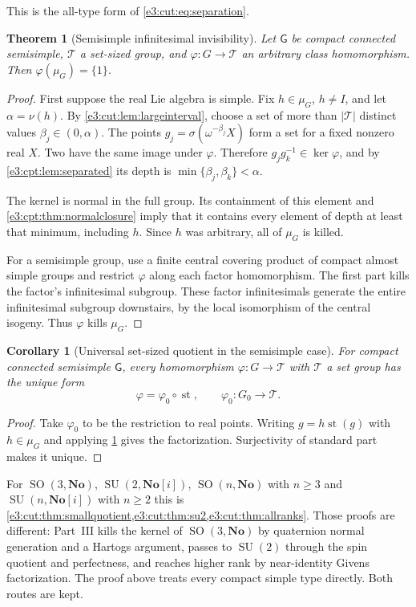\documentclass[11pt,letterpaper]{article}
\numberwithin{equation}{section}
\newtheorem{theorem}{Theorem}[section]
\newtheorem{corollary}[corollary]{Corollary}
\theoremstyle{definition}
\theoremstyle{remark}
\newcommand{\No}{\mathbf{No}}
\newcommand{\st}{\operatorname{st}}
\newcommand{\SO}{\operatorname{SO}}
\newcommand{\SU}{\operatorname{SU}}
\newcommand{\sG}{\mathsf G}
\begin{document}
This is the all-type form of \cref{e3:cut:eq:separation}.

\begin{theorem}[Semisimple infinitesimal invisibility]\label{e3:cpt:thm:kill}
Let $\sG$ be compact connected semisimple, $\mathcal T$ a set-sized group, and
$\varphi:G\to\mathcal T$ an arbitrary class homomorphism. Then
$\varphi(\mu_G)=\{1\}$.
\end{theorem}
\begin{proof}
First suppose the real Lie algebra is simple. Fix $h\in\mu_G$, $h\ne I$, and let
$\alpha=\nu(h)$. By \cref{e3:cut:lem:largeinterval}, choose a set of more than
$|\mathcal T|$ distinct values $\beta_j\in(0,\alpha)$. The points
$g_j=\sigma(\omega^{-\beta_j}X)$ form a set for a fixed nonzero real $X$. Two
have the same image under $\varphi$. Therefore $g_jg_k^{-1}\in\ker\varphi$, and
by \cref{e3:cpt:lem:separated} its depth is $\min\{\beta_j,\beta_k\}<\alpha$.

The kernel is normal in the full group. Its containment of this element and
\cref{e3:cpt:thm:normalclosure} imply that it contains every element of depth
at least that minimum, including $h$. Since $h$ was arbitrary, all of $\mu_G$
is killed.

For a semisimple group, use a finite central covering product of compact almost
simple groups and restrict $\varphi$ along each factor homomorphism. The first
part kills the factor's infinitesimal subgroup. These factor infinitesimals
generate the entire infinitesimal subgroup downstairs, by the local isomorphism
of the central isogeny. Thus $\varphi$ kills $\mu_G$.
\end{proof}

\begin{corollary}[Universal set-sized quotient in the semisimple case]\label{e3:cpt:cor:universal}
For compact connected semisimple $\sG$, every homomorphism
$\varphi:G\to\mathcal T$ with $\mathcal T$ a set group has the unique form
\[
 \varphi=\varphi_0\circ\st,
 \qquad\varphi_0:G_0\to\mathcal T.
\]
\end{corollary}
\begin{proof}
Take $\varphi_0$ to be the restriction to real points. Writing $g=h\st(g)$ with
$h\in\mu_G$ and applying \cref{e3:cpt:thm:kill} gives the factorization.
Surjectivity of standard part makes it unique.
\end{proof}

For $\SO(3,\No)$, $\SU(2,\No[i])$, $\SO(n,\No)$ with $n\ge3$ and $\SU(n,\No[i])$
with $n\ge2$ this is
\cref{e3:cut:thm:smallquotient,e3:cut:thm:su2,e3:cut:thm:allranks}. Those
proofs are different: Part~III kills the kernel of $\SO(3,\No)$ by quaternion
normal generation and a Hartogs argument, passes to $\SU(2)$ through the spin
quotient and perfectness, and reaches higher rank by near-identity Givens
factorization. The proof above treats every compact simple type directly. Both
routes are kept.
\end{document}

